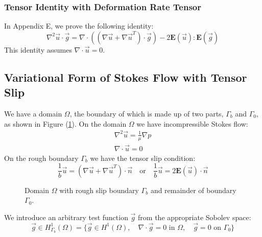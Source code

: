 \documentclass[12pt, a4paper, twoside, openright]{book}
\begin{document}
\subsubsection{Tensor Identity with Deformation Rate Tensor}

In Appendix E, we prove the following identity:
\begin{equation}
\nabla^2 \vec{u} \cdot \vec{g} = 
\nabla \cdot ( (\nabla \vec{u} + \nabla \vec{u}^T) \cdot \vec{g})
- 2 \mathbf{E}(\vec{u}):\mathbf{E}(\vec{g})
\label{tensoridentity}
\end{equation}
This identity assumes $\nabla \cdot \vec{u} = 0$.

\clearpage
\subsection{Variational Form of Stokes Flow with Tensor Slip}

We have a domain $\Omega$, the boundary of which is made up of two parts, $\Gamma_b$ and $\Gamma_0$, as shown in Figure (\ref{Stokesdomain}).  On the domain $\Omega$ we have incompressible Stokes flow:
\begin{gather}
\nabla^2 \vec{u} = \frac{1}{\mu} \nabla p  \\
\nabla \cdot \vec{u} = 0
\end{gather}
On the rough boundary $\Gamma_b$ we have the tensor slip condition:
\begin{equation}
\frac{1}{b} \vec{u} = (\nabla \vec{u} + \nabla \vec{u}^T)\cdot \vec{n}
\quad \text{or} \quad
\frac{1}{b} \vec{u} = 2 \mathbf{E}(\vec{u}) \cdot \vec{n}
\label{tensorslipBC}
\end{equation}

\begin{figure}[ht]
\centering
{}
\caption{Domain $\Omega$ with rough slip boundary $ \Gamma_b $ and remainder of boundary $\Gamma_0$.}\label{Stokesdomain}
\end{figure}

We introduce an arbitrary test function $\vec{g}$ from the appropriate Sobolev space:
\begin{equation}
\vec{g} \in H^1_{\Gamma_b}(\Omega) = 
\{ \vec{g} \in H^1(\Omega), \quad \nabla \cdot \vec{g} = 0 \text{ in } \Omega ,
 \quad \vec{g}=0 \text{ on } \Gamma_0 \}
\end{equation}
\end{document}
